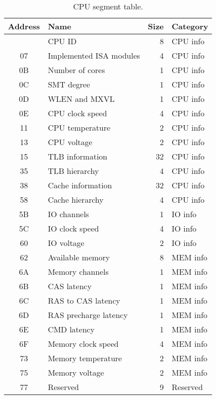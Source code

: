 \begin{table}[hbt!]

    \begin{center}

    \begin{tabular}{|c|l|r|l|}

        \hline
        Address & Name & Size & Category\\
        \hline
        \addlinespace[10pt]
        \hline
        00 & CPU ID & 8 & CPU info\\
        \hline
        07 & Implemented ISA modules & 4 & CPU info\\
        \hline
        0B & Number of cores & 1 & CPU info\\
        \hline
        0C & SMT degree & 1 & CPU info\\
        \hline
        0D & WLEN and MXVL & 1 & CPU info\\
        \hline
        0E & CPU clock speed & 4 & CPU info\\
        \hline
        11 & CPU temperature & 2 & CPU info\\
        \hline
        13 & CPU voltage & 2 & CPU info\\
        \hline
        15 & TLB information & 32 & CPU info\\
        \hline
        35 & TLB hierarchy & 4 & CPU info\\
        \hline
        38 & Cache information & 32 & CPU info\\
        \hline
        58 & Cache hierarchy & 4 & CPU info\\
        \hline
        5B & IO channels & 1 & IO info\\
        \hline
        5C & IO clock speed & 4 & IO info\\
        \hline
        60 & IO voltage & 2 & IO info\\
        \hline
        62 & Available memory & 8 & MEM info\\
        \hline
        6A & Memory channels & 1 & MEM info\\
        \hline
        6B & CAS latency & 1 & MEM info\\
        \hline
        6C & RAS to CAS latency & 1 & MEM info\\
        \hline
        6D & RAS precharge latency & 1 & MEM info\\
        \hline
        6E & CMD latency & 1 & MEM info\\
        \hline
        6F & Memory clock speed & 4 & MEM info\\
        \hline
        73 & Memory temperature & 2 & MEM info\\
        \hline
        75 & Memory voltage & 2 & MEM info\\
        \hline
        77 & Reserved & 9 & Reserved\\
        \hline

    \end{tabular}

    \caption[CPU segment table]{CPU segment table.}

    \end{center}

\end{table}